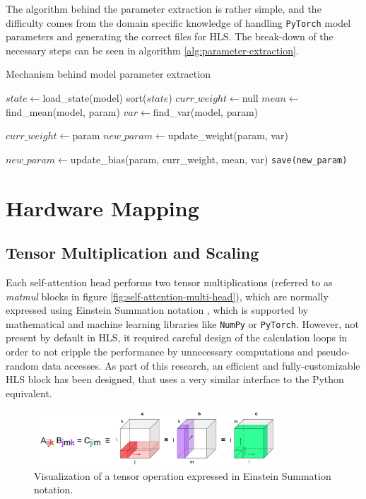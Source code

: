 The algorithm behind the parameter extraction is rather simple, and the difficulty comes from the domain specific knowledge of handling \texttt{PyTorch} model parameters and generating the correct files for HLS. The break-down of the necessary steps can be seen in algorithm \ref{alg:parameter-extraction}.

\begin{algorithm}
  \caption{Mechanism behind model parameter extraction}\label{alg:parameter-extraction}
  \begin{algorithmic}[1]
    \State $state \gets $load\_state(model)
    \State sort($state$)
    \State $curr\_weight \gets $null
      \State $mean \gets $find\_mean(model, param)
      \State $var \gets $find\_var(model, param)

        \State $curr\_weight \gets $param
        \State $new\_param \gets $update\_weight(param, var)

      \Else
        
        \State $new\_param \gets $update\_bias(param, curr\_weight, mean, var)
      \EndIf
      \State \texttt{save(new\_param)}
    \EndFor
  \end{algorithmic}
\end{algorithm}


\section{Hardware Mapping}


\subsection{Tensor Multiplication and Scaling}
Each self-attention head performs two tensor multiplications (referred to as \textit{matmul} blocks in figure \ref{fig:self-attention-multi-head}), which are normally expressed using Einstein Summation notation \cite{59-barr1991einstein}, which is supported by mathematical and machine learning libraries like \texttt{NumPy} or \texttt{PyTorch}. However, not present by default in HLS, it required careful design of the calculation loops in order to not cripple the performance by unnecessary computations and pseudo-random data accesses. As part of this research, an efficient and fully-customizable HLS block has been designed, that uses a very similar interface to the Python equivalent.

\begin{figure}[hpt!]
  \centering
  \includegraphics[trim={0cm 0cm 0cm 0cm}, width=0.8\textwidth, center]{models/einsum.pdf}
  \caption{Visualization of a tensor operation expressed in Einstein Summation notation.}
  \label{fig:einsum}
\end{figure}

